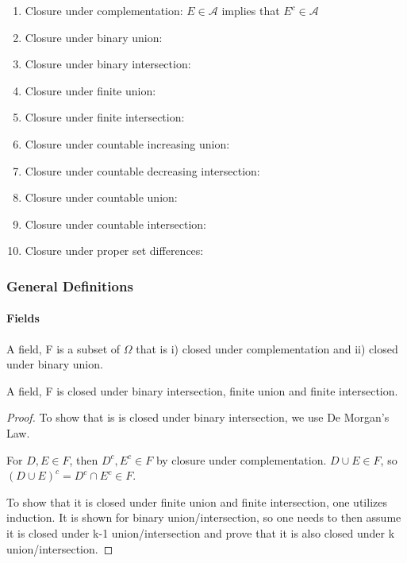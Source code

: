 \documentclass{article}
\theoremstyle{proposition}
\begin{document}
			\begin{enumerate}
				\item Closure under complementation: $E \in \mathcal{A}$ implies that $E^c \in \mathcal{A}$
				\item Closure under binary union:
				\item Closure under binary intersection:
				\item Closure under finite union:
				\item Closure under finite intersection:
				\item Closure under countable increasing union:
				\item Closure under countable decreasing intersection:
				\item Closure under countable union:
				\item Closure under countable intersection:
				\item Closure under proper set differences:
			\end{enumerate}

		\subsubsection{General Definitions}
			\paragraph{Fields}

			\begin{definition}
				A field, F is a subset of $\Omega$ that is i) closed under complementation and ii) closed under binary union.
			\end{definition}

			\begin{corollary}
				A field, F is closed under binary intersection, finite union and finite intersection.
			\end{corollary}
			\begin{proof}
				To show that is is closed under binary intersection, we use De Morgan's Law.

				For $D, E \in F$, then $D^c, E^c \in F$ by closure under complementation. $D \cup E \in F$, so $(D \cup E)^c = D^c \cap E^c \in F$.

				To show that it is closed under finite union and finite intersection, one utilizes induction. It is shown for binary union/intersection, so one needs to then assume it is closed under k-1 union/intersection and prove that it is also closed under k union/intersection.
			\end{proof}
\end{document}
